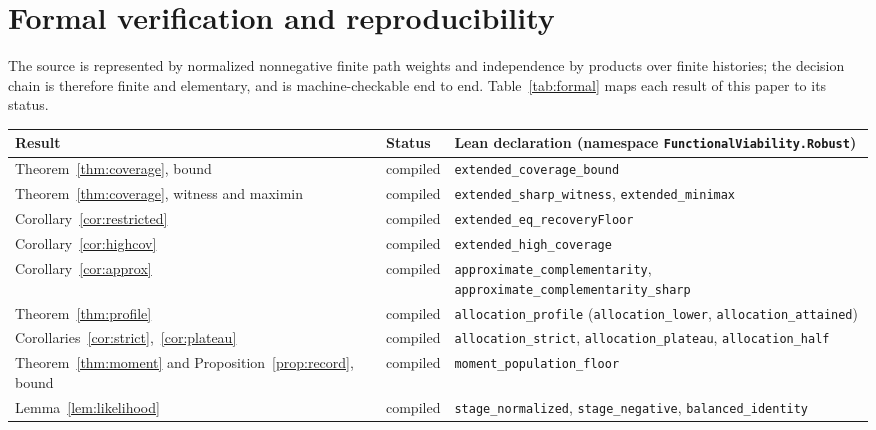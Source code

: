 \documentclass[11pt]{article}
\theoremstyle{definition}
\theoremstyle{remark}
\newcommand{\leanref}[1]{\texttt{#1}}
\begin{document}
\section{Formal verification and reproducibility}\label{sec:formal}

The source is represented by normalized nonnegative finite path weights and
independence by products over finite histories; the decision chain is therefore
finite and elementary, and is machine-checkable end to end. Table~\ref{tab:formal}
maps each result of this paper to its status.

\begin{table}[ht]
\centering\footnotesize
\begin{tabularx}{\linewidth}{@{}>{\raggedright\arraybackslash}p{4.4cm} l Y@{}}
\toprule
Result & Status & Lean declaration (namespace \leanref{FunctionalViability.Robust})\\
\midrule
Theorem~\ref{thm:coverage}, bound & compiled & \leanref{extended\_\allowbreak{}coverage\_\allowbreak{}bound}\\
Theorem~\ref{thm:coverage}, witness and maximin & compiled &
\leanref{extended\_\allowbreak{}sharp\_\allowbreak{}witness}, \leanref{extended\_\allowbreak{}minimax}\\
Corollary~\ref{cor:restricted} & compiled & \leanref{extended\_\allowbreak{}eq\_\allowbreak{}recoveryFloor}\\
Corollary~\ref{cor:highcov} & compiled & \leanref{extended\_\allowbreak{}high\_\allowbreak{}coverage}\\
Corollary~\ref{cor:approx} & compiled & \leanref{approximate\_\allowbreak{}complementarity},
\leanref{approximate\_\allowbreak{}complementarity\_\allowbreak{}sharp}\\
Theorem~\ref{thm:profile} & compiled & \leanref{allocation\_\allowbreak{}profile}
(\leanref{allocation\_\allowbreak{}lower}, \leanref{allocation\_\allowbreak{}attained})\\
Corollaries~\ref{cor:strict},~\ref{cor:plateau} & compiled &
\leanref{allocation\_\allowbreak{}strict}, \leanref{allocation\_\allowbreak{}plateau},
\leanref{allocation\_\allowbreak{}half}\\
Theorem~\ref{thm:moment} and Proposition~\ref{prop:record}, bound & compiled &
\leanref{moment\_\allowbreak{}population\_\allowbreak{}floor}\\
Lemma~\ref{lem:likelihood} & compiled & \leanref{stage\_\allowbreak{}normalized},
\leanref{stage\_\allowbreak{}negative}, \leanref{balanced\_\allowbreak{}identity}\\

\end{tabularx}
\end{table}
\end{document}
